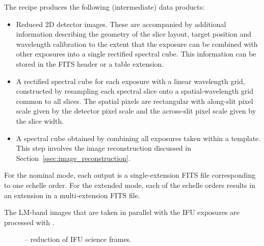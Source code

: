 The recipe produces the following (intermediate) data products:
\begin{itemize}\item Reduced 2D detector images. These are accompanied by additional
  information describing the geometry of the slice layout, target
  position and wavelength calibration to the extent that the exposure can be
  combined with other exposures into a single rectified spectral cube.
  This information can be stored in the FITS header or a table
  extension.
\item A rectified spectral cube for each exposure with a linear
  wavelength grid, constructed by resampling each spectral slice onto
  a spatial-wavelength grid common to all slices. The spatial pixels
  are rectangular with along-slit pixel scale given by the detector
  pixel scale and the across-slit pixel scale given by the slice
  width.
\item A spectral cube obtained by combining all exposures taken within
  a template. This step involves the image reconstruction discussed in
  Section~\ref{ssec:image_reconstruction}.
\end{itemize}

For the nominal mode, each output is a single-extension FITS file
corresponding to one echelle order. For the extended mode, each of the
echelle orders results in an extension in a multi-extension FITS
file.


The LM-band images that are taken in parallel with the IFU exposures are
processed with .




\begin{figure}[hb]
  \centering
    \def \globalscale {0.700000}
    \fontsize{10}{12}\selectfont
    
  \caption[Recipe: ]{%
     -- reduction of IFU science frames.}
  \label{fig:metis_ifu_reduce}
\end{figure}
\restoregeometry

